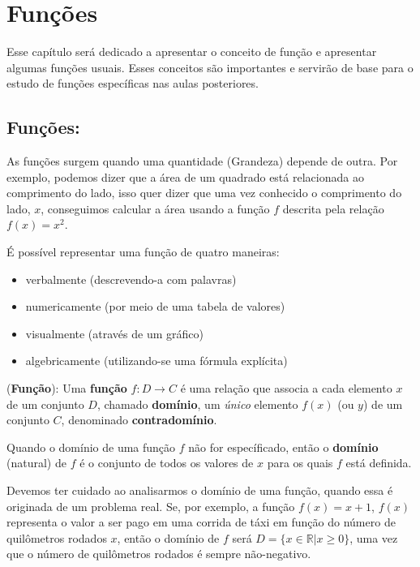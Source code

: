 
\chapter{Funções}
Esse capítulo será dedicado a apresentar o conceito de função e apresentar algumas funções usuais. Esses conceitos são importantes e servirão de base para o estudo de funções específicas nas aulas posteriores.
\section{Funções:}
As funções surgem quando uma quantidade (Grandeza) depende de outra. Por exemplo, podemos dizer que a área de um quadrado está relacionada ao comprimento do lado, isso quer dizer que uma vez conhecido o comprimento do lado, $x$, conseguimos calcular a área usando a função $f$ descrita pela relação $f(x)=x^2$.
\vspace{0.5cm}

É possível representar uma função de quatro maneiras:

\begin{itemize}
 \item verbalmente (descrevendo-a com palavras)
\hspace{2cm}
\item numericamente (por meio de uma tabela de valores)

\item  visualmente (através de um gráfico)

\item algebricamente (utilizando-se uma fórmula explícita)
\end{itemize}
\vspace{0.5cm}

\begin{defin}(\textbf{Função}): Uma \textbf{função} $f:D\to C$ é uma relação que associa a cada elemento $x$ de um conjunto $D$, chamado \textbf{domínio}, um \textit{único} elemento $f(x)$ (ou $y$) de um conjunto $C$, denominado \textbf{contradomínio}.
\end{defin}

\begin{obs} Quando o domínio de uma função $f$ não for específicado, então o \textbf{domínio} (natural) de $f$ é o conjunto de todos os valores de $x$ para os quais $f$ está definida.
\end{obs}
\begin{obs}
Devemos ter cuidado ao analisarmos o domínio de uma função, quando essa é originada de um problema real. Se, por exemplo, a função $f(x)=x+1$, $f(x)$ representa o valor a ser pago em uma corrida de táxi em função do número de quilômetros rodados $x$, então o domínio de $f$ será $D= \{ x \in \mathbb{R} | x \geq 0 \}$, uma vez que o número de quilômetros rodados é sempre não-negativo.
\end{obs}

